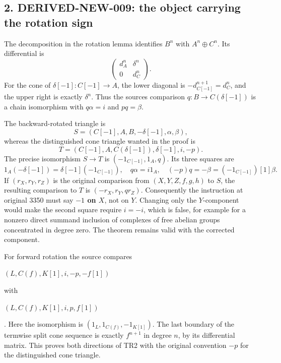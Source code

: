 \documentclass[11pt]{article}
\begin{document}
\subsection{\texorpdfstring{2. DERIVED-NEW-009:\allowbreak{} the object carrying the rotation sign}{2.  the object carrying the rotation sign}}\label{proofs-2995-3485-derived-new-009-the-object-carrying-the-rotation-sign}

The decomposition in the rotation lemma identifies \(B^n\) with \(A^n\oplus C^n\). Its differential is \[
\begin{pmatrix}d_A^n&\delta^n\\0&d_C^n\end{pmatrix}.
\] For the cone of \(\delta[-1]:C[-1]\to A\),\allowbreak{} the lower diagonal is \(-d_{C[-1]}^{n+1}=d_C^n\),\allowbreak{} and the upper right is exactly \(\delta^n\). Thus the source\textquotesingle s comparison \(q:B\to C(\delta[-1])\) is a chain isomorphism with \(q\alpha=i\) and \(pq=\beta\).

The backward-rotated triangle is \[
S=(C[-1],A,B,-\delta[-1],\alpha,\beta),
\] whereas the distinguished cone triangle wanted in the proof is \[
T=(C[-1],A,C(\delta[-1]),\delta[-1],i,-p).
\] The precise isomorphism \(S\to T\) is \((-1_{C[-1]},1_A,q)\). Its three squares are \[
1_A(-\delta[-1])=\delta[-1](-1_{C[-1]}),\quad
q\alpha=i1_A,\quad (-p)q=-\beta=(-1_{C[-1]})[1]\beta.
\] If \((r_X,r_Y,r_Z)\) is the original comparison from \((X,Y,Z,f,g,h)\) to \(S\),\allowbreak{} the resulting comparison to \(T\) is \((-r_X,r_Y,qr_Z)\). Consequently the instruction at original 3350 must say \textbf{\(-1\) on \(X\)},\allowbreak{} not on \(Y\). Changing only the \(Y\)-component would make the second square require \(i=-i\),\allowbreak{} which is false,\allowbreak{} for example for a nonzero direct summand inclusion of complexes of free abelian groups concentrated in degree zero. The theorem remains valid with the corrected component.

For forward rotation the source compares 
\par\noindent \((L,C(f),K[1],i,-p,-f[1])\)\par\noindent
 with 
\par\noindent \((L,C(f),K[1],i,p,f[1])\)\par\noindent
. Here the isomorphism is \((1_L,1_{C(f)},-1_{K[1]})\). The last boundary of the termwise split cone sequence is exactly \(f^{n+1}\) in degree \(n\),\allowbreak{} by its differential matrix. This proves both directions of TR2 with the original convention \(-p\) for the distinguished cone triangle.
\end{document}
